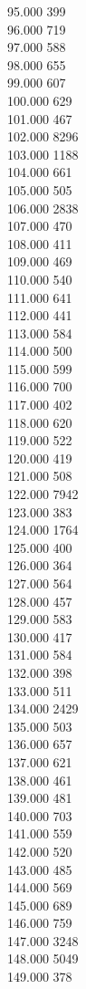 { 95.000	399 \\
 96.000	719 \\
 97.000	588 \\
 98.000	655 \\
 99.000	607 \\
 100.000	629 \\
 101.000	467 \\
 102.000	8296 \\
 103.000	1188 \\
 104.000	661 \\
 105.000	505 \\
 106.000	2838 \\
 107.000	470 \\
 108.000	411 \\
 109.000	469 \\
 110.000	540 \\
 111.000	641 \\
 112.000	441 \\
 113.000	584 \\
 114.000	500 \\
 115.000	599 \\
 116.000	700 \\
 117.000	402 \\
 118.000	620 \\
 119.000	522 \\
 120.000	419 \\
 121.000	508 \\
 122.000	7942 \\
 123.000	383 \\
 124.000	1764 \\
 125.000	400 \\
 126.000	364 \\
 127.000	564 \\
 128.000	457 \\
 129.000	583 \\
 130.000	417 \\
 131.000	584 \\
 132.000	398 \\
 133.000	511 \\
 134.000	2429 \\
 135.000	503 \\
 136.000	657 \\
 137.000	621 \\
 138.000	461 \\
 139.000	481 \\
 140.000	703 \\
 141.000	559 \\
 142.000	520 \\
 143.000	485 \\
 144.000	569 \\
 145.000	689 \\
 146.000	759 \\
 147.000	3248 \\
 148.000	5049 \\
 149.000	378 \\
}
